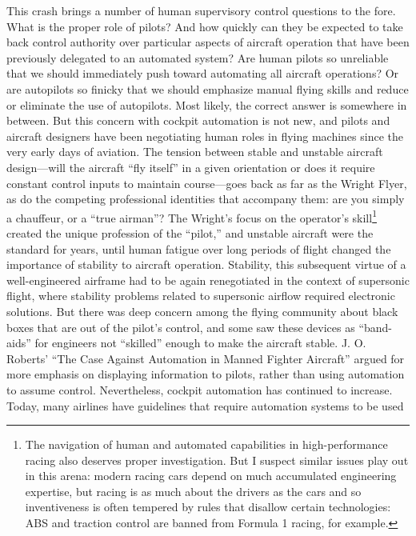 This crash brings a number of human supervisory control questions to
the fore. What is the proper role of pilots? And how quickly can they
be expected to take back control authority over particular aspects of
aircraft operation that have been previously delegated to an automated
system? Are human pilots so unreliable that we should immediately push
toward automating all aircraft operations? Or are autopilots so
finicky that we should emphasize manual flying skills and reduce or
eliminate the use of autopilots. Most likely, the correct answer is
somewhere in between. But this concern with cockpit automation is not
new, and pilots and aircraft designers have been negotiating human
roles in flying machines since the very early days of aviation. The
tension between stable and unstable aircraft design---will the
aircraft ``fly itself'' in a given orientation or does it require
constant control inputs to maintain course---goes back as far as the
Wright Flyer, as do the competing professional identities that
accompany them: are you simply a chauffeur, or a ``true
airman''\cite[p. 21]{???-DM}? The Wright's focus on the operator's
skill\footnote{The navigation of human and automated capabilities in
  high-performance racing also deserves proper investigation. But I suspect
similar issues play out in this arena: modern racing cars depend on
much accumulated engineering expertise, but racing is as much about
the drivers as the cars and so inventiveness is often tempered by
rules that disallow certain technologies:  ABS and traction control are
banned from Formula 1 racing, for example.} created the unique profession of the
``pilot,'' and unstable aircraft were the standard for years, until
human fatigue over long periods of flight changed the importance of
stability to aircraft operation\cite[p. 22-24]{???-DM}. Stability,
this subsequent virtue of a well-engineered airframe had to be again
renegotiated in the context of supersonic flight, where stability
problems related to supersonic airflow required electronic
solutions\cite[p. 33]{???-DM}. But there was deep concern among the
flying community about black boxes that are out of the pilot's
control, and some saw these devices as ``band-aids'' for engineers not
``skilled'' enough to make the aircraft stable\cite[p. 35]{???-DM}. J.
O. Roberts' ``The Case Against Automation in Manned Fighter Aircraft''
argued for more emphasis on displaying information to pilots, rather
than using automation to assume control\cite[p. 35]{???-DM}.
Nevertheless, cockpit automation has continued to increase. Today,
many airlines 
have guidelines that require automation systems to be used
